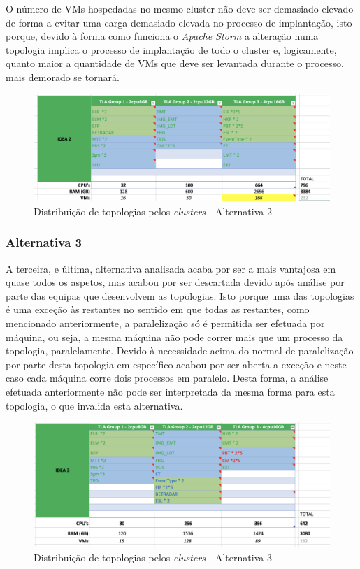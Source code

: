 O número de \acp{VM} hospedadas no mesmo \gls{cluster} não deve ser demasiado elevado de forma a
evitar uma carga demasiado elevada no processo de implantação, isto porque, devido à forma como 
funciona o \textit{Apache Storm} a alteração numa topologia implica o processo de implantação de
todo o \gls{cluster} e, logicamente, quanto maior a quantidade de \acp{VM} que deve ser levantada
durante o processo, mais demorado se tornará.

\begin{figure}[H]
  \centerline{\includegraphics[scale=0.4]{media/content/analise/proposal-2.png}}
  \caption{Distribuição de topologias pelos \textit{clusters} - Alternativa 2}
  \label{proposal-2}
\end{figure}

\subsubsection{Alternativa 3}

A terceira, e última, alternativa analisada acaba por ser a mais vantajosa em quase todos os 
aspetos, mas acabou por ser descartada devido após análise por parte das equipas que desenvolvem as 
topologias. Isto porque uma das topologias é uma exceção às restantes no sentido em que todas as
restantes, como mencionado anteriormente, a paralelização só é permitida ser efetuada por máquina, 
ou seja, a mesma máquina não pode correr mais que um processo da topologia, paralelamente.
Devido à necessidade acima do normal de paralelização por parte desta topologia em específico
acabou por ser aberta a exceção e neste caso cada máquina corre dois processos em paralelo.
Desta forma, a análise efetuada anteriormente não pode ser interpretada da mesma forma para esta
topologia, o que invalida esta alternativa.

\begin{figure}[H]
  \centerline{\includegraphics[scale=0.4]{media/content/analise/proposal-3.png}}
  \caption{Distribuição de topologias pelos \textit{clusters} - Alternativa 3}
  \label{proposal-3}
\end{figure}

